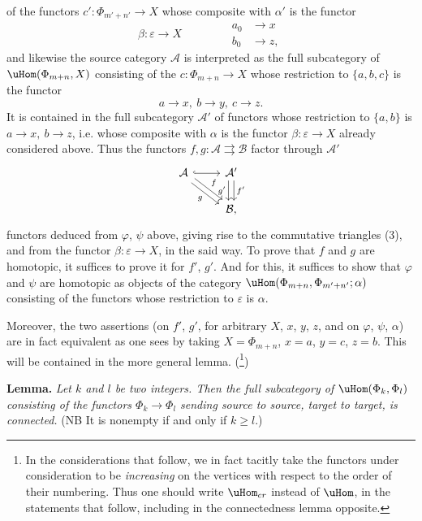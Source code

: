 of the functors $c':\Phi_{m'+n'}\longrightarrow X$ whose composite with $\alpha'$ is the functor
\[
\beta:\varepsilon\longrightarrow X\qquad\qquad
\begin{aligned}
a_0&\longrightarrow x\\
b_0&\longrightarrow z,
\end{aligned} \tag*{$(*)$}
\]
and likewise the source category $\mathcal{A}$ is interpreted as the full subcategory of $\uHom(\Phi_{m+n},X)$ consisting of the $c:\Phi_{m+n}\longrightarrow X$ whose restriction to $\{a,b,c\}$ is the functor
\[
a\longrightarrow x,\ b\longrightarrow y,\ c\longrightarrow z.
\]
 It is contained in the full subcategory $\mathcal{A}'$ of functors whose restriction to $\{a,b\}$ is $a\longrightarrow x,\ b\longrightarrow z$, i.e. whose composite with $\alpha$ is the functor $\beta:\varepsilon\longrightarrow X$ already considered above. Thus the functors $f,g:\mathcal{A}\rightrightarrows\mathcal{B}$ factor through $\mathcal{A}'$
\[
\begin{tikzcd}
\mathcal{A} \arrow[r,hook] \arrow[dr,shift left,"f"] \arrow[dr,shift right,"g"'] & \mathcal{A}' \arrow[d,shift right,"g'"'] \arrow[d,shift left,"f'"] \\
 & \mathcal{B},
\end{tikzcd}
\]
functors deduced from $\varphi$, $\psi$ above, giving rise to the commutative triangles (3), and from the functor $\beta:\varepsilon\longrightarrow X$, in the said way. To prove that $f$ and $g$ are homotopic, it suffices to prove it for $f'$, $g'$. And for this, it suffices to show that $\varphi$ and $\psi$ are homotopic as objects of the category $\uHom(\Phi_{m+n},\Phi_{m'+n'};\alpha)$ consisting of the functors whose restriction to $\varepsilon$ is $\alpha$.

Moreover, the two assertions (on $f'$, $g'$, for arbitrary $X$, $x$, $y$, $z$, and on $\varphi$, $\psi$, $\alpha$) are in fact equivalent as one sees by taking $X=\Phi_{m+n}$, $x=a$, $y=c$, $z=b$. This will be contained in the more general lemma. (\footnote[4]{In the considerations that follow, we in fact tacitly take the functors under consideration to be \textit{increasing} on the vertices with respect to the order of their numbering. Thus one should write $\uHom_{cr}$ instead of $\uHom$, in the statements that follow, including in the connectedness lemma opposite.})

\textbf{Lemma.} \textit{Let $k$ and $l$ be two integers. Then the full subcategory of $\uHom(\Phi_k,\Phi_l)$ consisting of the functors $\Phi_k\longrightarrow\Phi_l$ sending source to source, target to target, is connected.} (NB It is nonempty if and only if $k\geq l$.)

